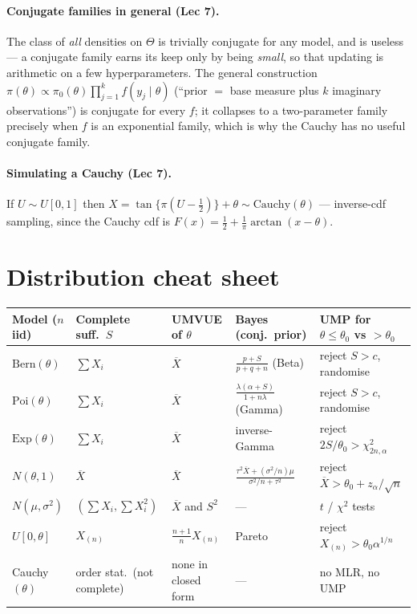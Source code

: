 \documentclass[11pt]{article}
\theoremstyle{remark}
\newcommand{\Xbar}{\overline{X}}
\begin{document}
\paragraph{Conjugate families in general (Lec 7).} The class of \emph{all} densities on
$\Theta$ is trivially conjugate for any model, and is useless --- a conjugate family earns its
keep only by being \emph{small}, so that updating is arithmetic on a few hyperparameters. The
general construction $\pi(\theta)\propto\pi_0(\theta)\prod_{j=1}^k f(y_j\mid\theta)$ (``prior
$=$ base measure plus $k$ imaginary observations'') is conjugate for every $f$; it collapses to
a two-parameter family precisely when $f$ is an exponential family, which is why the Cauchy has
no useful conjugate family.

\paragraph{Simulating a Cauchy (Lec 7).} If $U\sim U[0,1]$ then
$X=\tan\{\pi(U-\tfrac12)\}+\theta\sim\mathrm{Cauchy}(\theta)$ --- inverse-cdf sampling, since
the Cauchy cdf is $F(x)=\tfrac12+\tfrac1\pi\arctan(x-\theta)$.

\section{Distribution cheat sheet}

\begin{center}
\renewcommand{\arraystretch}{1.45}
\small
\begin{tabular}{@{}p{2.3cm}p{2.4cm}p{3.1cm}p{3.3cm}p{3.4cm}@{}}
\toprule
Model ($n$ iid) & Complete suff.\ $S$ & UMVUE of $\theta$ & Bayes (conj.\ prior) & UMP for $\theta\le\theta_0$ vs $>\theta_0$ \\
\midrule
$\mathrm{Bern}(\theta)$ & $\sum X_i$ & $\Xbar$ & $\frac{p+S}{p+q+n}$ (Beta) & reject $S>c$, randomise \\
$\mathrm{Poi}(\theta)$ & $\sum X_i$ & $\Xbar$ & $\frac{\lambda(\alpha+S)}{1+n\lambda}$ (Gamma) & reject $S>c$, randomise \\
$\mathrm{Exp}(\theta)$ & $\sum X_i$ & $\Xbar$ & inverse-Gamma & reject $2S/\theta_0>\chi^2_{2n,\alpha}$ \\
$N(\theta,1)$ & $\Xbar$ & $\Xbar$ & $\frac{\tau^2\Xbar+(\sigma^2\!/n)\mu}{\sigma^2\!/n+\tau^2}$ & reject $\Xbar>\theta_0+z_\alpha/\sqrt n$ \\
$N(\mu,\sigma^2)$ & $(\sum X_i,\sum X_i^2)$ & $\Xbar$ and $S^2$ & --- & $t$ / $\chi^2$ tests \\
$U[0,\theta]$ & $X_{(n)}$ & $\frac{n+1}{n}X_{(n)}$ & Pareto & reject $X_{(n)}>\theta_0\alpha^{1/n}$ \\
Cauchy$(\theta)$ & order stat.\ (not complete) & none in closed form & --- & no MLR, no UMP \\
\bottomrule
\end{tabular}
\end{center}
\end{document}
